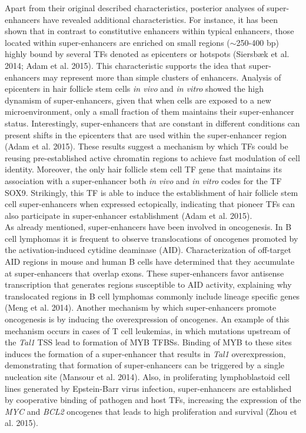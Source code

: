 Apart from their original described characteristics, posterior analyses of super-enhancers have revealed additional characteristics. For instance, it has been shown that in contrast to constitutive enhancers within typical enhancers, those located within super-enhancers are enriched on small regions ($\sim$250-400 bp) highly bound by several TFs denoted as epicenters or hotspots (Siersbæk et al. 2014; Adam et al. 2015). This characteristic supports the idea that super-enhancers may represent more than simple clusters of enhancers. Analysis of epicenters in hair follicle stem cells \textit{in vivo} and \textit{in vitro} showed the high dynamism of super-enhancers, given that when cells are exposed to a new microenvironment, only a small fraction of them maintains their super-enhancer status. Interestingly, super-enhancers that are constant in different conditions can present shifts in the epicenters that are used within the super-enhancer region (Adam et al. 2015). These results suggest a mechanism by which TFs could be reusing pre-established active chromatin regions to achieve fast modulation of cell identity. Moreover, the only hair follicle stem cell TF gene that maintains its association with a super-enhancer both \textit{in vivo} and \textit{in vitro} codes for the TF SOX9. Strikingly, this TF is able to induce the establishment of hair follicle stem cell super-enhancers when expressed ectopically, indicating that pioneer TFs can also participate in super-enhancer establishment (Adam et al. 2015).\\

As already mentioned, super-enhancers have been involved in oncogenesis. In B cell lymphomas it is frequent to observe translocations of oncogenes promoted by the activation-induced cytidine deaminase (AID). Characterization of off-target AID regions in mouse and human B cells have determined that they accumulate at super-enhancers that overlap exons. These super-enhancers favor antisense transcription that generates regions susceptible to AID activity, explaining why translocated regions in B cell lymphomas commonly include lineage specific genes (Meng et al. 2014). Another mechanism by which super-enhancers promote oncogenesis is by inducing the overexpression of oncogenes. An example of this mechanism occurs in cases of T cell leukemias, in which mutations upstream of the \textit{Tal1} TSS lead to formation of MYB TFBSs. Binding of MYB to these sites induces the formation of a super-enhancer that results in \textit{Tal1} overexpression, demonstrating that formation of super-enhancers can be triggered by a single nucleation site (Mansour et al. 2014). Also, in proliferating lymphoblastoid cell lines generated by Epstein-Barr virus infection, super-enhancers are established by cooperative binding of pathogen and host TFs, increasing the expression of the \textit{MYC} and \textit{BCL2} oncogenes that leads to high proliferation and survival (Zhou et al. 2015).\\

